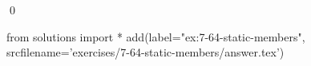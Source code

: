 
\begin{ex}
  \label{ex:7-64-static-members}
  
  \qed
\end{ex}
\begin{python0}
from solutions import *
add(label="ex:7-64-static-members",
    srcfilename='exercises/7-64-static-members/answer.tex')
\end{python0}
